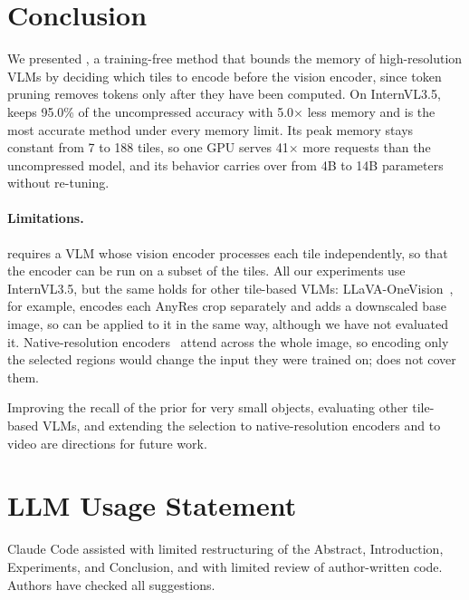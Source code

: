 \section{Conclusion}
\label{sec:conclusion}

We presented \method, a training-free method that bounds the memory of high-resolution VLMs by
deciding which tiles to encode before the vision encoder, since token pruning removes tokens only after
they have been computed. On InternVL3.5, \method keeps 95.0\% of the uncompressed accuracy with
5.0$\times$ less memory and is the most accurate method under every memory limit. Its peak memory stays
constant from 7 to 188 tiles, so one GPU serves 41$\times$ more requests than the uncompressed model,
and its behavior carries over from 4B to 14B parameters without re-tuning.

\paragraph{Limitations.}
\method requires a VLM whose vision encoder processes each tile independently, so that the encoder can be
run on a subset of the tiles. All our experiments use InternVL3.5, but the same holds for other tile-based
VLMs: LLaVA-OneVision~\cite{llavaov}, for example, encodes each AnyRes crop separately and adds a
downscaled base image, so \method can be applied to it in the same way, although we have not evaluated it.
Native-resolution encoders~\cite{qwen2vl} attend across the whole image, so encoding only the selected
regions would change the input they were trained on; \method does not cover them.

Improving the recall of the prior for very small objects, evaluating other tile-based VLMs, and
extending the selection to native-resolution encoders and to video are directions for future work.

\section*{LLM Usage Statement}
Claude Code assisted with limited restructuring of the Abstract, Introduction, Experiments, and Conclusion,
and with limited review of author-written code. Authors have checked all suggestions.

